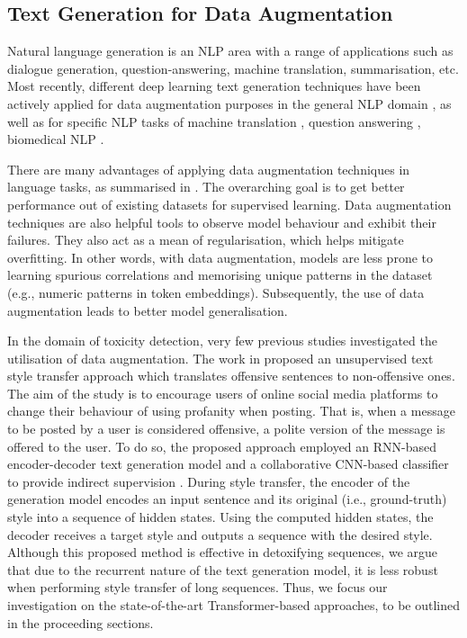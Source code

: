 \documentclass[acmsmall]{acmart}
\begin{document}
\subsection{Text Generation for Data Augmentation}
 Natural language generation is an NLP area with a range of applications such as dialogue generation, question-answering, machine translation, summarisation, etc. Most recently, different deep learning text generation techniques have been actively applied for data augmentation purposes in the general NLP domain \cite{liu-etal-2020-data,wei-zou-2019-eda}, as well as for specific NLP tasks of machine translation \cite{edunov-etal-2018-understanding, Sennrich2016}, question answering \cite{data-aug-qa}, biomedical NLP \cite{ive-2020}. 

There are many advantages of applying data augmentation techniques in language tasks, as summarised in \cite{data-aug-for-dl}. The overarching goal is to get better performance out of existing  datasets for supervised learning. Data augmentation techniques are also helpful tools to observe model behaviour and exhibit their failures. They also act as a mean of regularisation, which helps mitigate  overfitting. In other words, with data augmentation, models are less prone to learning spurious correlations and memorising unique patterns in the dataset (e.g., numeric patterns in token embeddings). Subsequently, the use of data augmentation leads to better model generalisation.

In the domain of toxicity detection, very few previous studies  investigated the utilisation of data augmentation. The work in \cite{unsupervised-text-style-transfer} proposed an unsupervised text style transfer approach which translates offensive sentences to non-offensive ones. The aim of the study is to encourage users of online social media platforms to change their behaviour of using profanity when posting. That is, when a message to be posted by a user is considered offensive, a polite version of the message is offered to the user. To do so, the proposed approach employed an RNN-based encoder-decoder text generation model and a collaborative CNN-based classifier to provide indirect supervision \cite{unsupervised-text-style-transfer}. During style transfer, the encoder of the generation model encodes an input sentence and its original (i.e., ground-truth) style into a sequence of hidden states. Using the computed hidden states, the decoder receives a target style and outputs a sequence with the desired style. Although this proposed method is effective in detoxifying sequences, we argue that due to the recurrent nature of the text generation model, it is less robust when performing style transfer of long sequences. Thus, we focus our investigation on the state-of-the-art Transformer-based approaches, to be outlined in the proceeding sections.
\end{document}
